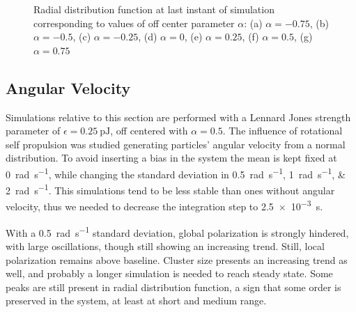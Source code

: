 \documentclass[../../master_thesis_np.tex]{subfiles}
\begin{document}
		\begin{figure}\ContinuedFloat
			\centering
			
			\caption{Radial distribution function at last instant of simulation corresponding to values of off center parameter $\alpha$: (a) $\alpha = -0.75$, (b) $\alpha = -0.5$, (c) $\alpha = -0.25$, (d) $\alpha = 0$, (e) $\alpha = 0.25$, (f) $\alpha = 0.5$, (g) $\alpha = 0.75$}
			\label{fig:lj_oc_rdf}
		\end{figure}
		
		\subsection{Angular Velocity}
		Simulations relative to this section are performed with a Lennard Jones strength parameter of $\epsilon = \SI{0.25}{\pico\joule}$, off centered with $\alpha = 0.5$.
		The influence of rotational self propulsion was studied generating particles' angular velocity from a normal distribution.
		To avoid inserting a bias in the system the mean is kept fixed at \SI{0}{\radian\per\second}, while changing the standard deviation in \qtylist{0.5; 1;2}{\radian\per\second}.
		This simulations tend to be less stable than ones without angular velocity, thus we needed to decrease the integration step to \SI{2.5 e-3}{\second}.
		
		With a \SI{0.5}{\radian\per\second} standard deviation, global polarization is strongly hindered, with large oscillations, though still showing an increasing trend.
		Still, local polarization remains above baseline.
		Cluster size presents an increasing trend as well, and probably a longer simulation is needed to reach steady state.
		Some peaks are still present in radial distribution function, a sign that some order is preserved in the system, at least at short and medium range.
		
\end{document}
